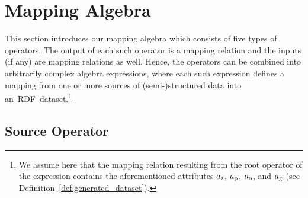 \vspace{-2mm} %
\enlargethispage{\baselineskip}%

\section{Mapping Algebra}%
\label{sec:mapping_algebra}



This section introduces our mapping algebra which consists of
	five
types of operators.
The output of each such operator is a mapping relation and the inputs (if any)
are mapping relations as well.
Hence, the operators can be combined into arbitrarily complex algebra
expressions, where each such expression defines a mapping from one or more
sources of (semi-)structured data into an~RDF~dataset.\footnote{We assume here
that the mapping relation resulting from the root operator of the expression
contains the aforementioned attributes $a_\textrm{s}$, $a_\textrm{p}$, $a_\textrm{o}$,
and $a_\textrm{g}$ (see Definition~\ref{def:generated_dataset}).}


\subsection{Source Operator}%
\label{sub:source_operator}

\vspace{-2mm} %
\enlargethispage{\baselineskip}%

